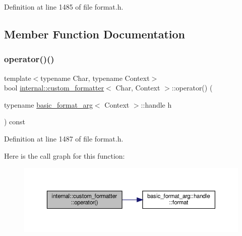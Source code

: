 Definition at line 1485 of file format.\+h.



\subsection{Member Function Documentation}
\mbox{\label{classinternal_1_1custom__formatter_a3e431cda430aa3c0e55fe202bc6f0cca}} 
\subsubsection{\texorpdfstring{operator()()}{operator()()}\hspace{0.1cm}{\footnotesize\ttfamily [1/2]}}
{\footnotesize\ttfamily template$<$typename Char, typename Context$>$ \\
bool \hyperlink{classinternal_1_1custom__formatter}{internal\+::custom\+\_\+formatter}$<$ Char, Context $>$\+::operator() (\begin{DoxyParamCaption}\item[{typename \hyperlink{classbasic__format__arg}{basic\+\_\+format\+\_\+arg}$<$ Context $>$\+::handle}]{h }\end{DoxyParamCaption}) const\hspace{0.3cm}{\ttfamily [inline]}}



Definition at line 1487 of file format.\+h.

Here is the call graph for this function\+:
\nopagebreak
\begin{figure}[H]
\begin{center}
\leavevmode
\includegraphics[width=350pt]{classinternal_1_1custom__formatter_a3e431cda430aa3c0e55fe202bc6f0cca_cgraph}
\end{center}
\end{figure}
\mbox{\label{classinternal_1_1custom__formatter_aedd6d67c1caa7ed1867bfd7e859c261a}} 
